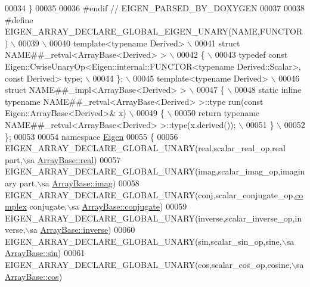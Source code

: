 \begin{DoxyCode}
00034 \textcolor{preprocessor}{  \}}
00035 
00036 \textcolor{preprocessor}{#endif // EIGEN\_PARSED\_BY\_DOXYGEN}
00037 
00038 \textcolor{preprocessor}{#define EIGEN\_ARRAY\_DECLARE\_GLOBAL\_EIGEN\_UNARY(NAME,FUNCTOR) \(\backslash\)}
00039 \textcolor{preprocessor}{  \(\backslash\)}
00040 \textcolor{preprocessor}{  template<typename Derived> \(\backslash\)}
00041 \textcolor{preprocessor}{  struct NAME##\_retval<ArrayBase<Derived> > \(\backslash\)}
00042 \textcolor{preprocessor}{  \{ \(\backslash\)}
00043 \textcolor{preprocessor}{    typedef const Eigen::CwiseUnaryOp<Eigen::internal::FUNCTOR<typename Derived::Scalar>, const Derived>
       type; \(\backslash\)}
00044 \textcolor{preprocessor}{  \}; \(\backslash\)}
00045 \textcolor{preprocessor}{  template<typename Derived> \(\backslash\)}
00046 \textcolor{preprocessor}{  struct NAME##\_impl<ArrayBase<Derived> > \(\backslash\)}
00047 \textcolor{preprocessor}{  \{ \(\backslash\)}
00048 \textcolor{preprocessor}{    static inline typename NAME##\_retval<ArrayBase<Derived> >::type run(const Eigen::ArrayBase<Derived>& x)
       \(\backslash\)}
00049 \textcolor{preprocessor}{    \{ \(\backslash\)}
00050 \textcolor{preprocessor}{      return typename NAME##\_retval<ArrayBase<Derived> >::type(x.derived()); \(\backslash\)}
00051 \textcolor{preprocessor}{    \} \(\backslash\)}
00052 \textcolor{preprocessor}{  \};}
00053 
00054 \textcolor{keyword}{namespace }\hyperlink{namespace_eigen}{Eigen}
00055 \{
00056   EIGEN\_ARRAY\_DECLARE\_GLOBAL\_UNARY(real,scalar\_real\_op,real part,\(\backslash\)sa 
      \hyperlink{group___core___module_a3c09942b87b89c06dc204fe8cf514ade}{ArrayBase::real})
00057   EIGEN\_ARRAY\_DECLARE\_GLOBAL\_UNARY(imag,scalar\_imag\_op,imaginary part,\(\backslash\)sa 
      \hyperlink{group___core___module_ac0e2019654b0bf1e82ada75b3ea9e5ef}{ArrayBase::imag})
00058   EIGEN\_ARRAY\_DECLARE\_GLOBAL\_UNARY(conj,scalar\_conjugate\_op,\hyperlink{structcomplex}{complex} conjugate,\(\backslash\)sa 
      \hyperlink{group___core___module_a06602058e7d80827b7b0ec7cb72a747a}{ArrayBase::conjugate})
00059   EIGEN\_ARRAY\_DECLARE\_GLOBAL\_UNARY(inverse,scalar\_inverse\_op,inverse,\(\backslash\)sa 
      \hyperlink{group___core___module_a6b2a84065ff875d9491cf8d84ddbee2f}{ArrayBase::inverse})
00060   EIGEN\_ARRAY\_DECLARE\_GLOBAL\_UNARY(sin,scalar\_sin\_op,sine,\(\backslash\)sa \hyperlink{group___core___module_a8f857f93533ac386282f47c5ef05459a}{ArrayBase::sin})
00061   EIGEN\_ARRAY\_DECLARE\_GLOBAL\_UNARY(cos,scalar\_cos\_op,cosine,\(\backslash\)sa \hyperlink{group___core___module_abe1bff4421b16e62e75f932b83c4d31f}{ArrayBase::cos})

\end{DoxyCode}
